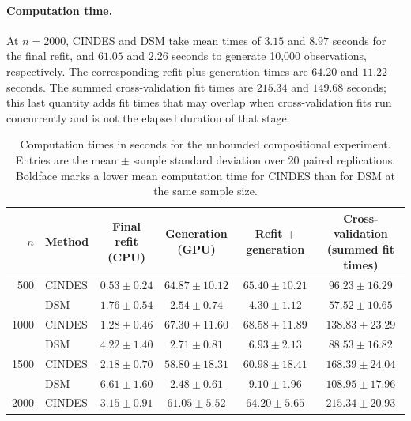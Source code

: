 \paragraph{Computation time.}
At $n=2000$, CINDES and DSM take mean times of $3.15$ and $8.97$
seconds for the final refit, and $61.05$ and $2.26$ seconds to generate
10,000 observations, respectively. The corresponding refit-plus-generation
times are $64.20$ and $11.22$ seconds. The summed cross-validation fit
times are $215.34$ and $149.68$ seconds; this last quantity adds fit times
that may overlap when cross-validation fits run concurrently and is not
the elapsed duration of that stage.

\begin{table}[htbp]
\centering
\caption{Computation times in seconds for the unbounded compositional experiment. Entries are the mean $\pm$ sample standard deviation over 20 paired replications. Boldface marks a lower mean computation time for CINDES than for DSM at the same sample size.}
\label{tab:cindes_runtime_full}
\small
\setlength{\tabcolsep}{4pt}
\renewcommand{\arraystretch}{1.15}
\begin{tabular}{rlcccc}
\toprule
$n$ & Method & \shortstack{Final refit\\(CPU)} & \shortstack{Generation\\(GPU)} & \shortstack{Refit $+$\\generation} & \shortstack{Cross-validation\\(summed fit times)} \\
\midrule
500 & CINDES & $\boldsymbol{0.53 \pm 0.24}$ & $64.87 \pm 10.12$ & $65.40 \pm 10.21$ & $96.23 \pm 16.29$ \\
 & DSM & $1.76 \pm 0.54$ & $2.54 \pm 0.74$ & $4.30 \pm 1.12$ & $57.52 \pm 10.65$ \\
\midrule
1000 & CINDES & $\boldsymbol{1.28 \pm 0.46}$ & $67.30 \pm 11.60$ & $68.58 \pm 11.89$ & $138.83 \pm 23.29$ \\
 & DSM & $4.22 \pm 1.40$ & $2.71 \pm 0.81$ & $6.93 \pm 2.13$ & $88.53 \pm 16.82$ \\
\midrule
1500 & CINDES & $\boldsymbol{2.18 \pm 0.70}$ & $58.80 \pm 18.31$ & $60.98 \pm 18.41$ & $168.39 \pm 24.04$ \\
 & DSM & $6.61 \pm 1.60$ & $2.48 \pm 0.61$ & $9.10 \pm 1.96$ & $108.95 \pm 17.96$ \\
\midrule
2000 & CINDES & $\boldsymbol{3.15 \pm 0.91}$ & $61.05 \pm 5.52$ & $64.20 \pm 5.65$ & $215.34 \pm 20.93$ \\

\end{tabular}
\end{table}

